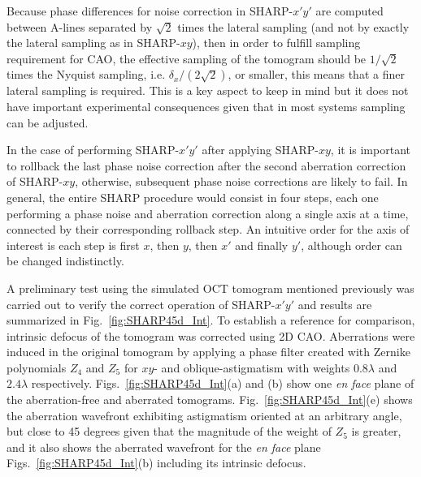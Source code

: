 Because phase differences for noise correction in SHARP-$x'y'$ are computed between A-lines separated by $\sqrt{2}$ times the lateral sampling (and not by exactly the lateral sampling as in SHARP-$xy$), then in order to fulfill sampling requirement for CAO, the effective sampling of the tomogram should be $1/\sqrt{2}$ times the Nyquist sampling, i.e. $\delta_x/(2\sqrt{2})$, or smaller, this means that a finer lateral sampling is required. This is a key aspect to keep in mind but it does not have important experimental consequences given that in most systems sampling can be adjusted.

In the case of performing SHARP-$x'y'$ after applying SHARP-$xy$, it is important to rollback the last phase noise correction after the second aberration correction of  SHARP-$xy$, otherwise, subsequent phase noise corrections are likely to fail. In general, the entire SHARP procedure would consist in four steps, each one performing a phase noise and aberration correction along a single axis at a time, connected by their corresponding rollback step. An intuitive order for the axis of interest is each step is first $x$, then $y$, then $x'$ and finally $y'$, although order can be changed indistinctly.

A preliminary test using the simulated OCT tomogram mentioned previously was carried out to verify the correct operation of SHARP-$x'y'$ and results are summarized in Fig.~\ref{fig:SHARP45d_Int}. To establish a reference for comparison, intrinsic defocus of the tomogram was corrected using 2D CAO. Aberrations were induced in the original tomogram by applying a phase filter created with Zernike polynomials $Z_4$ and $Z_5$ for $xy$- and oblique-astigmatism with weights $0.8\lambda$ and $2.4\lambda$ respectively. Figs.~\ref{fig:SHARP45d_Int}(a) and (b) show one \textit{en face} plane of the aberration-free and aberrated tomograms. Fig.~\ref{fig:SHARP45d_Int}(e) shows the aberration wavefront exhibiting astigmatism oriented at an arbitrary angle, but close to 45 degrees given that the magnitude of the weight of $Z_5$ is greater, and it also shows the aberrated wavefront for the \textit{en face} plane Figs.~\ref{fig:SHARP45d_Int}(b) including its intrinsic defocus. 

